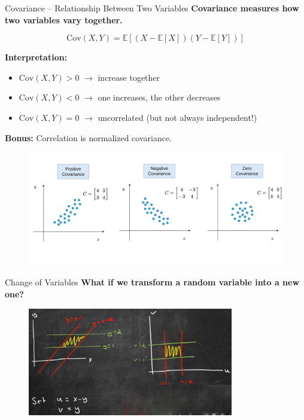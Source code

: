\documentclass[handout,aspectratio=169]{beamer}
\begin{document}
\begin{frame}{Covariance – Relationship Between Two Variables}
  \textbf{Covariance measures how two variables vary together.}

  \vspace{1em}
  \[
    \text{Cov}(X, Y) = \mathbb{E}[(X - \mathbb{E}[X])(Y - \mathbb{E}[Y])]
  \]

  \textbf{Interpretation:}
  \begin{itemize}
    \item $\text{Cov}(X, Y) > 0$ $\rightarrow$ increase together
    \item $\text{Cov}(X, Y) < 0$ $\rightarrow$ one increases, the other decreases
    \item $\text{Cov}(X, Y) = 0$ $\rightarrow$ uncorrelated (but not always independent!)
  \end{itemize}

  \vspace{1em}
  \textbf{Bonus:} Correlation is normalized covariance.
\end{frame}

\begin{frame}[plain]
	\begin{figure}[htbp]
		\centering
		\includegraphics[width=\textwidth]{chapter_figs/01_figs/covariance.jpg}
	\end{figure}
\end{frame}

\begin{frame}{Change of Variables}
  \textbf{What if we transform a random variable into a new one?}
  \vspace{1em}
  \begin{figure}[htbp]
		\centering
		\includegraphics[width=0.8\textwidth]{chapter_figs/01_figs/change_of_variables.png}
	\end{figure}
  
\end{frame}
\end{document}
